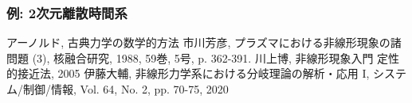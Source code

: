 \documentclass[]{jlreq}
\begin{document}
\subsubsection{例: 2次元離散時間系}
%
\begin{thebibliography}{9}
    アーノルド, 古典力学の数学的方法
    市川芳彦, プラズマにおける非線形現象の諸問題 (3), 核融合研究, 1988, 59巻, 5号, p. 362-391.
    川上博, 非線形現象入門 定性的接近法, 2005
    伊藤大輔, 非線形力学系における分岐理論の解析・応用 I, システム/制御/情報, Vol. 64, No. 2, pp. 70-75, 2020
  \end{thebibliography}
%
\end{document}
